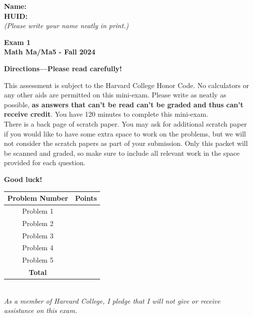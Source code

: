 \documentclass{article}
\begin{document}
\noindent
{\large \mbox{} \hfill \bf Name:\underline{\hspace{3in}}}\\

{\large \mbox{} \hfill \bf HUID:\underline{\hspace{3in}}}\\
{\mbox{} \hfill \it (Please write your name neatly in print.)}\\


 
\medskip
 
\noindent
{\large\bf
Exam 1  \\ Math Ma/Ma5 - Fall 2024}
\noindent


{\Large
\begin{center}\textbf{Directions---Please read carefully!} \end{center}}



This assessment is subject to the Harvard College Honor Code. No calculators or any other aids are permitted on this mini-exam.  Please write as neatly as possible, \textbf{as answers that can't be read can't be graded and thus can't receive credit}. You have 120 minutes to complete this mini-exam.   \\

There is a back page of scratch paper. You may ask for additional scratch paper if you would like to have some extra space to work on the problems, but we will not consider the scratch papers as part of your submission. Only this packet will be scanned and graded, so make sure to include all relevant work in the space provided for each question. 

\begin{center}\textbf{Good luck!}\end{center}




    \centering
    \begin{tabular}{|c|c|}
    \hline
      \textbf{Problem Number}   & \textbf{Points}  \\
             \hline \hline
                Problem 1   &   \\
            \hline
                 Problem 2 &   \\
        \hline 
                Problem 3 &   \\
        \hline 
                Problem 4 &   \\
        \hline 
                Problem 5 &   \\
        \hline 
               
               
         \textbf{Total} &   \\
         \hline 
    \end{tabular}\\
\vspace{0.5in}
\emph{As a member of Harvard College, I pledge that I will not give or receive assistance on this exam.}\\
\\
\end{document}

